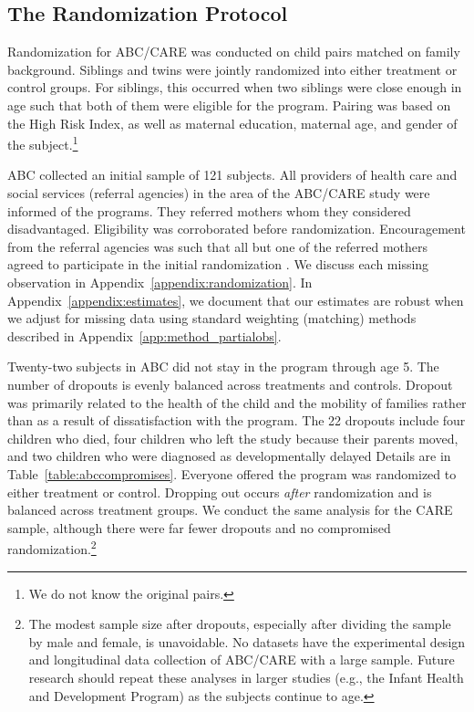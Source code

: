 \subsection{The Randomization Protocol} \label{section:randomization}

Randomization for ABC/CARE was conducted on child pairs matched on family background. Siblings and twins were jointly randomized into either treatment or control groups. For siblings, this occurred when two siblings were close enough in age such that both of them were eligible for the program. Pairing was based on the High Risk Index, as well as maternal education, maternal age, and gender of the subject.\footnote{We do not know the original pairs.}

ABC collected an initial sample of 121 subjects. All providers of health care and social services (referral agencies) in the area of the ABC/CARE study were informed of the programs. They referred mothers whom they considered disadvantaged. Eligibility was corroborated before randomization. Encouragement from the referral agencies was such that all but one of the referred mothers agreed to participate in the initial randomization \citep{Ramey_Yeates_Short_1984_CD,Campbell_Ramey_1995_AERJ}.  We discuss each missing observation in Appendix~\ref{appendix:randomization}. In Appendix~\ref{appendix:estimates}, we document that our estimates are robust when we adjust for missing data using standard weighting (matching) methods described in Appendix~\ref{app:method_partialobs}.

Twenty-two subjects in ABC did not stay in the program through age 5. The number of dropouts is evenly balanced across treatments and controls. Dropout was primarily related to the health of the child and the mobility of families rather than as a result of  dissatisfaction with the program. The 22 dropouts include four children who died, four children who left the study because their parents moved, and two children who were diagnosed as developmentally delayed \citep{Burchinal_Campbell_etal_1997_CD} Details are in Table~\ref{table:abccompromises}. Everyone offered the program was randomized to either treatment or control. Dropping out occurs \emph{after} randomization and is balanced across treatment groups. We conduct the same analysis for the CARE sample, although there were far fewer dropouts and no compromised randomization.\footnote{The modest sample size after dropouts, especially after dividing the sample by male and female, is unavoidable. No datasets have the experimental design and longitudinal data collection of ABC/CARE with a large sample. Future research should repeat these analyses in larger studies (e.g., the Infant Health and Development Program) as the subjects continue to age.}

